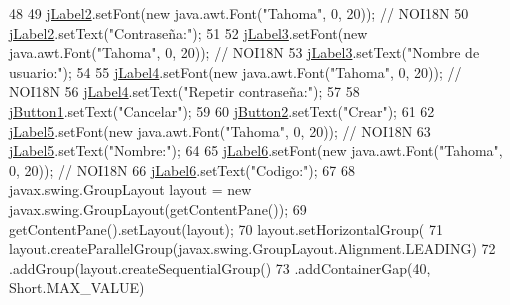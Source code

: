 \begin{DoxyCode}
48 
49         \mbox{\hyperlink{classsoftware_1_1registrar_a24b0c3144951c1a694a839a57632b467}{jLabel2}}.setFont(\textcolor{keyword}{new} java.awt.Font(\textcolor{stringliteral}{"Tahoma"}, 0, 20)); \textcolor{comment}{// NOI18N}
50         \mbox{\hyperlink{classsoftware_1_1registrar_a24b0c3144951c1a694a839a57632b467}{jLabel2}}.setText(\textcolor{stringliteral}{"Contraseña:"});
51 
52         \mbox{\hyperlink{classsoftware_1_1registrar_ab18af739a7842cf44586f9f1ccf4cb5d}{jLabel3}}.setFont(\textcolor{keyword}{new} java.awt.Font(\textcolor{stringliteral}{"Tahoma"}, 0, 20)); \textcolor{comment}{// NOI18N}
53         \mbox{\hyperlink{classsoftware_1_1registrar_ab18af739a7842cf44586f9f1ccf4cb5d}{jLabel3}}.setText(\textcolor{stringliteral}{"Nombre de usuario:"});
54 
55         \mbox{\hyperlink{classsoftware_1_1registrar_a1cc93efa5caf9078801eef6056e86867}{jLabel4}}.setFont(\textcolor{keyword}{new} java.awt.Font(\textcolor{stringliteral}{"Tahoma"}, 0, 20)); \textcolor{comment}{// NOI18N}
56         \mbox{\hyperlink{classsoftware_1_1registrar_a1cc93efa5caf9078801eef6056e86867}{jLabel4}}.setText(\textcolor{stringliteral}{"Repetir contraseña:"});
57 
58         \mbox{\hyperlink{classsoftware_1_1registrar_aef5c4d6cf5be63bd07f311ce4f590faf}{jButton1}}.setText(\textcolor{stringliteral}{"Cancelar"});
59 
60         \mbox{\hyperlink{classsoftware_1_1registrar_aad55bb3040eec6aa4685c2641dbff85b}{jButton2}}.setText(\textcolor{stringliteral}{"Crear"});
61 
62         \mbox{\hyperlink{classsoftware_1_1registrar_a8155b7123176cb4088549ac2325f25f4}{jLabel5}}.setFont(\textcolor{keyword}{new} java.awt.Font(\textcolor{stringliteral}{"Tahoma"}, 0, 20)); \textcolor{comment}{// NOI18N}
63         \mbox{\hyperlink{classsoftware_1_1registrar_a8155b7123176cb4088549ac2325f25f4}{jLabel5}}.setText(\textcolor{stringliteral}{"Nombre:"});
64 
65         \mbox{\hyperlink{classsoftware_1_1registrar_a613b33aab588faff234599788161a0aa}{jLabel6}}.setFont(\textcolor{keyword}{new} java.awt.Font(\textcolor{stringliteral}{"Tahoma"}, 0, 20)); \textcolor{comment}{// NOI18N}
66         \mbox{\hyperlink{classsoftware_1_1registrar_a613b33aab588faff234599788161a0aa}{jLabel6}}.setText(\textcolor{stringliteral}{"Codigo:"});
67 
68         javax.swing.GroupLayout layout = \textcolor{keyword}{new} javax.swing.GroupLayout(getContentPane());
69         getContentPane().setLayout(layout);
70         layout.setHorizontalGroup(
71             layout.createParallelGroup(javax.swing.GroupLayout.Alignment.LEADING)
72             .addGroup(layout.createSequentialGroup()
73                 .addContainerGap(40, Short.MAX\_VALUE)

\end{DoxyCode}
